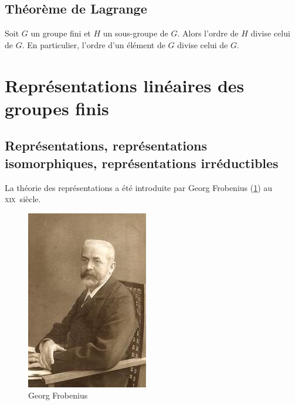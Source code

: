 \documentclass[french]{article}
\begin{document}
\subsection{Théorème de Lagrange}

\begin{thm}[De Lagrange] \label{lagrange}
  Soit \(G\) un groupe fini et \(H\) un sous-groupe de \(G\). Alors l'ordre de \(H\) divise celui de \(G\). En particulier, l'ordre d'un élément de \(G\) divise celui de \(G\).
\end{thm}

\section{Représentations linéaires des groupes finis}

\subsection{Représentations, représentations isomorphiques, représentations irréductibles}

La théorie des représentations a été introduite par Georg Frobenius (\ref{Frobenius}) au \textsc{xix}\ieme ~siècle.

\begin{figure}[h!]
  \centering
  \includegraphics[scale=0.3]{Frobenius.jpg}
  \caption{Georg Frobenius}
  \label{Frobenius}
\end{figure}
\end{document}

